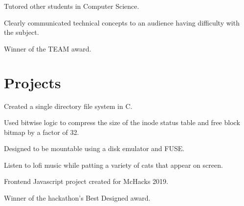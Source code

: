 \documentclass[]{willguthrie-resume}
\begin{document}
\begin{minipage}[t]{0.66\textwidth}
	\begin{tightemize}
		\item Tutored other students in Computer Science.
		\item Clearly communicated technical concepts to an audience having difficulty with the subject. 
		\item Winner of the TEAM award.
	\end{tightemize}

	
	\sectionsep
	\section{Projects}

	\begin{tightemize}
		\item Created a single directory file system in C.
		\item Used bitwise logic to compress the size of the inode status table and free block bitmap by a factor of 32.
		\item Designed to be mountable using a disk emulator and FUSE.
	\end{tightemize}

	\begin{tightemize}
		\item Listen to lofi music while patting a variety of cats that appear on screen.
		\item Frontend Javascript project created for McHacks 2019.
		\item Winner of the hackathon's Best Designed award.
	\end{tightemize}


\end{minipage}
\end{document}
